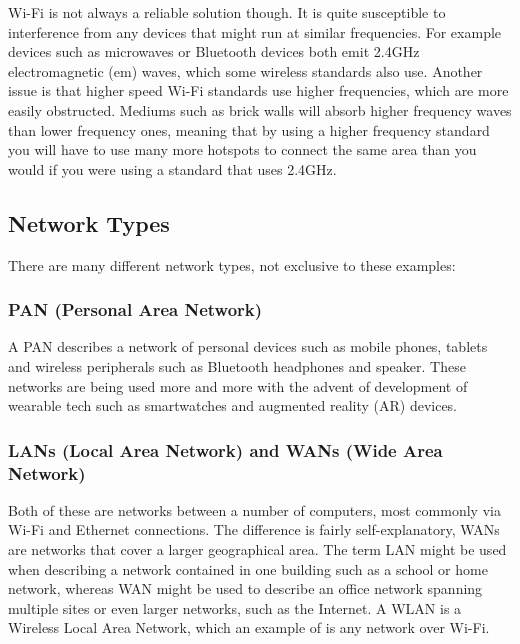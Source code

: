 Wi-Fi is not always a reliable solution though. It is quite susceptible to interference from any devices that might run at similar frequencies. For example devices such as microwaves or Bluetooth devices both emit 2.4GHz electromagnetic (em) waves, which some wireless standards also use. Another issue is that higher speed Wi-Fi standards use higher frequencies, which are more easily obstructed. Mediums such as brick walls will absorb higher frequency waves than lower frequency ones, meaning that by using a higher frequency standard you will have to use many more hotspots to connect the same area than you would if you were using a standard that uses 2.4GHz.

\hypertarget{network-types}{%
\subsection{Network Types}\label{network-types}}

There are many different network types, not exclusive to these examples:

\hypertarget{pan-personal-area-network}{%
\subsubsection{PAN (Personal Area Network)}\label{pan-personal-area-network}}

A PAN describes a network of personal devices such as mobile phones, tablets and wireless peripherals such as Bluetooth headphones and speaker. These networks are being used more and more with the advent of development of wearable tech such as smartwatches and augmented reality (AR) devices.

\hypertarget{lans-local-area-network-and-wans-wide-area-network}{%
\subsubsection{LANs (Local Area Network) and WANs (Wide Area Network)}\label{lans-local-area-network-and-wans-wide-area-network}}

Both of these are networks between a number of computers, most commonly via Wi-Fi and Ethernet connections. The difference is fairly self-explanatory, WANs are networks that cover a larger geographical area. The term LAN might be used when describing a network contained in one building such as a school or home network, whereas WAN might be used to describe an office network spanning multiple sites or even larger networks, such as the Internet. A WLAN is a Wireless Local Area Network, which an example of is any network over Wi-Fi.

